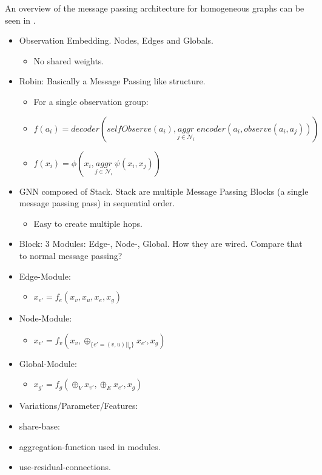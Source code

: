 An overview of the message passing architecture for homogeneous graphs can be seen in .

\begin{itemize}[noitemsep,nolistsep]
    \item Observation Embedding. Nodes, Edges and Globals.
    \begin{itemize}[noitemsep,nolistsep]
        \item No shared weights.
    \end{itemize}
    \item Robin: Basically a Message Passing like structure.
    \begin{itemize}[noitemsep,nolistsep]
        \item For a single observation group:
        \item $f(a_i) = decoder(selfObserve(a_i), \underset{j \in \mathcal{N}_i}{aggr}\ encoder(a_i, observe(a_i, a_j)))$
        \item $f(x_i) = \phi(x_i, \underset{j \in \mathcal{N}_i}{aggr}\ \psi(x_i, x_j))$
    \end{itemize}
    \item GNN composed of Stack. Stack are multiple Message Passing Blocks (a single message passing pass) in sequential order.
    \begin{itemize}[noitemsep,nolistsep]
        \item Easy to create multiple hops.
    \end{itemize}
    \item Block: 3 Modules: Edge-, Node-, Global. How they are wired. Compare that to normal message passing?
    \item Edge-Module:
    \begin{itemize}[noitemsep,nolistsep]
        \item $x_{e'} = f_e(x_v, x_u, x_e, x_g)$
    \end{itemize}
    \item Node-Module:
    \begin{itemize}[noitemsep,nolistsep]
        \item $x_{v'} = f_v(x_v, \oplus_{\{e'=(v,u)||_v\}} x_{e'}, x_g)$
    \end{itemize}
    \item Global-Module:
    \begin{itemize}[noitemsep,nolistsep]
        \item $x_{g'} = f_g(\oplus_V x_{v'}, \oplus_E x_{e'}, x_g)$
    \end{itemize}
    \item Variations/Parameter/Features:
    \item share-base:
    \item aggregation-function used in modules.
    \item use-residual-connections.
\end{itemize}

